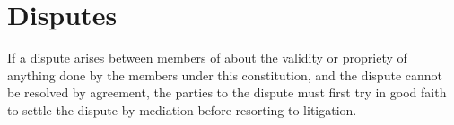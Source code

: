 \section{Disputes}\label{sec:disputes}
If a dispute arises between members of \shortname{} about the validity or propriety of anything done by the members under this constitution, and the dispute cannot be resolved by agreement, the parties to the dispute must first try in good faith to settle the dispute by mediation before resorting to litigation.
